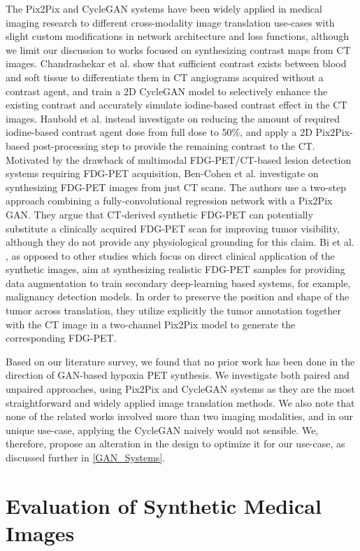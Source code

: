 The Pix2Pix and CycleGAN systems have been widely applied in medical imaging research to different cross-modality image translation use-cases \cite{yi2019generative} with slight custom modifications in network architecture and loss functions, although we limit our discussion to works focused on synthesizing contrast maps from CT images. Chandrashekar et al. \cite{chandrashekar2020deep} show that sufficient contrast exists between blood and soft tissue to differentiate them in CT angiograms acquired without a contrast agent, and train a 2D CycleGAN model to selectively enhance the existing contrast and accurately simulate iodine-based contrast effect in the CT images. Haubold et al. \cite{haubold2021contrast} instead investigate on reducing the amount of required iodine-based contrast agent dose from full dose to 50\%, and apply a 2D Pix2Pix-based post-processing step to provide the remaining contrast to the CT. Motivated by the drawback of multimodal FDG-PET/CT-based lesion detection systems requiring FDG-PET acquisition, Ben-Cohen et al. \cite{bencohen2018crossmodality} investigate on synthesizing FDG-PET images from just CT scans. The authors use a two-step approach combining a fully-convolutional regression network with a Pix2Pix GAN. They argue that CT-derived synthetic FDG-PET can potentially substitute a clinically acquired FDG-PET scan for improving tumor visibility, although they do not provide any physiological grounding for this claim. Bi et al. \cite{bi2017synthesis}, as opposed to other studies which focus on direct clinical application of the synthetic images, aim at synthesizing realistic FDG-PET samples for providing data augmentation to train secondary deep-learning based systems, for example, malignancy detection models. In order to preserve the position and shape of the tumor across translation, they utilize explicitly the tumor annotation together with the CT image in a two-channel Pix2Pix model to generate the corresponding FDG-PET. 

Based on our literature survey, we found that no prior work has been done in the direction of GAN-based hypoxia PET synthesis. We investigate both paired and unpaired approaches, using Pix2Pix and CycleGAN systems as they are the most straightforward and widely applied image translation methods. We also note that none of the related works involved more than two imaging modalities, and in our unique use-case, applying the CycleGAN naively would not sensible. We, therefore, propose an alteration in the design to optimize it for our use-case, as discussed further in \ref{GAN_Systems}.



\section{Evaluation of Synthetic Medical Images}
